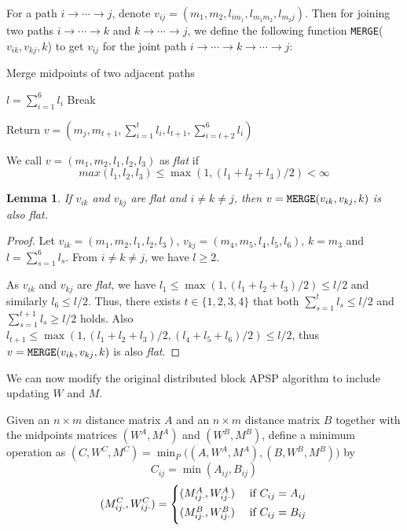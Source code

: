\documentclass{article} %
\newtheorem{lemma}[theorem]{Lemma}
\begin{document}
For a path $i \to \cdots \to j$, denote $v_{ij} = (m_1, m_2, l_{im_1}, l_{m_1m_2}, l_{m_2j})$. Then for joining two paths $i \to \cdots \to k$ and $k \to \cdots \to j$, we define the following function {\tt MERGE}($v_{ik}, v_{kj}, k$) to get $v_{ij}$ for the joint path $i \to \cdots \to k \to \cdots \to j$:

\begin{algorithm}[H]
\caption{Merge midpoints of two adjacent paths}
\begin{algorithmic}
 \State $l = \sum_{i = 1}^6 l_i$
	  \State Break
	\EndIf
 \EndFor

  Return $v = (m_j, m_{t+1}, \sum_{i = 1}^t l_i, l_{t + 1}, \sum_{i = t + 2}^6 l_i)$
\EndFunction
\end{algorithmic}
\end{algorithm}

We call $v = (m_1, m_2, l_1, l_2, l_3)$ as \textit{flat} if 
$$max(l_1, l_2, l_3) \leq \max(1, (l_1 + l_2 + l_3)/2) < \infty$$


\begin{lemma}
If $v_{ik}$ and $v_{kj}$ are \textit{flat} and $i \neq k \neq j$, then $v = {\tt MERGE}(v_{ik}, v_{kj}, k)$ is also \textit{flat}.
\end{lemma}

\begin{proof}
Let $v_{ik} = (m_1, m_2, l_1, l_2, l_3)$, $v_{kj} = (m_4, m_5, l_4, l_5, l_6)$, $k = m_3$ and 
$l = \sum_{s = 1}^6 l_s$. From $i\neq k \neq j$, we have $l \geq 2$. 

As $v_{ik}$ and $v_{kj}$ are \textit{flat}, we have 
$l_1 \leq \max(1, (l_1 + l_2 + l_3)/2) \leq l/2$ and similarly $l_6 \leq l/2$. Thus, there exists
$t \in \{1, 2, 3, 4\}$ that both $\sum_{s = 1}^t l_s \leq l/2 $ and $\sum_{s = 1}^{t + 1} l_s \geq l/2$ holds.
Also $l_{t + 1} \leq \max(1, (l_1 + l_2 + l_3)/2, (l_4 + l_5 + l_6)/2) \leq l/2$, thus 
$v = {\tt MERGE}(v_{ik}, v_{kj}, k)$ is also \textit{flat}.
\end{proof}

We can now modify the original distributed block APSP algorithm to include updating $W$ and $M$. 

Given an $n \times m$ distance matrix $A$ and an $n \times m$ distance matrix $B$ together with the midpoints matrices $(W^A, M^A)$ and $(W^B, M^B)$, define a minimum operation as 
$(C, W^C, M^C) = \min_P\big((A, W^A, M^A), (B, W^B, M^B)\big)$ by
\[
C_{ij} = \min(A_{ij}, B_{ij})
\]
\[
(M^C_{ij\cdot}, W^C_{ij\cdot}) = 
\begin{cases}
\vspace{1mm}
(M^A_{ij\cdot}, W^A_{ij\cdot}) & \text{ if }C_{ij} = A_{ij} \\
\vspace{1mm}
(M^B_{ij\cdot}, W^B_{ij\cdot}) & \text{ if }C_{ij} = B_{ij} 
\end{cases}
\]
\end{document}
